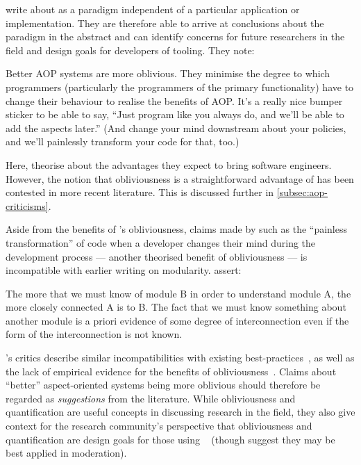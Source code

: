 \citeauthor{filman2000aspect} write about \aspectorientation{} as a paradigm
independent of a particular application or implementation. They are therefore
able to arrive at conclusions about the paradigm in the abstract and can
identify concerns for future researchers in the field and design goals for
developers of \aspectoriented{} tooling. They note:

\begin{displayquote}
  Better AOP systems are more oblivious. They minimise the degree to which
  programmers (particularly the programmers of the primary functionality) have
  to change their behaviour to realise the benefits of AOP. It's a really nice
  bumper sticker to be able to say, ``Just program like you always do, and we'll
  be able to add the aspects later.'' (And change your mind downstream about
  your policies, and we'll painlessly transform your code for that,
  too.)~\cite{filman2000aspect}
\end{displayquote}

Here, \citeauthor{filman2000aspect} theorise about the advantages they expect
\aspectorientation{} to bring software engineers. However, the notion that
obliviousness is a straightforward advantage of \aop{} has been contested in
more recent literature. This is discussed further in
\cref{subsec:aop-criticisms}.

Aside from the benefits of \aop{}'s obliviousness, claims made by
\citeauthor{filman2000aspect} such as the ``painless transformation'' of code
when a developer changes their mind during the development process --- another
theorised benefit of obliviousness --- is incompatible with earlier writing on
modularity. \citet{yourdon1979structured} assert:

\begin{displayquote}
  The more that we must know of module B in order to understand module A, the
  more closely connected A is to B. The fact that we must know something about
  another module is a priori evidence of some degree of interconnection even if
  the form of the interconnection is not known.
\end{displayquote}

\Aspectorientation{}'s critics describe similar incompatibilities with existing
best-practices~\cite{przybylek2010wrong,Constantinides04aopconsidered}, as well
as the lack of empirical evidence for the benefits of
obliviousness~\cite{steimann06paradoxical}. Claims about ``better''
aspect-oriented systems being more oblivious should therefore be regarded as
\emph{suggestions} from the literature. While obliviousness and quantification
are useful concepts in discussing research in the field, they also give context
for the research community's perspective that obliviousness and quantification
are design goals for those using
\aop{}~\cite{AspectCplusplusDesignImpl,kell2008survey,Charfi2006AspectOrientedWL}
(though \citet{leavens2007multiple} suggest they may be best applied in
moderation).

